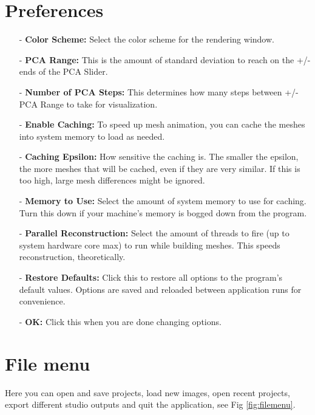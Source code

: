 \documentclass[letterpaper,12pt]{article}   %
\begin{document}
\section{Preferences}

\begin{itemize}
\item[-] \textbf{Color Scheme:} Select the color scheme for the rendering window.

\item[-] \textbf{PCA Range:} This is the amount of standard deviation to reach on the +/- ends of the PCA Slider.

\item[-] \textbf{Number of PCA Steps:} This determines how many steps between +/- PCA Range to take for visualization.

\item[-] \textbf{Enable Caching:} To speed up mesh animation, you can cache the meshes into system memory to load as needed.

\item[-] \textbf{Caching Epsilon:} How sensitive the caching is. The smaller the epsilon, the more meshes that will be cached, even if they are very similar. If this is too high, large mesh differences might be ignored.

\item[-] \textbf{Memory to Use:} Select the amount of system memory to use for caching. Turn this down if your machine's memory is bogged down from the program.

\item[-] \textbf{Parallel Reconstruction:} Select the amount of threads to fire (up to system hardware core max) to run while building meshes. This speeds reconstruction, theoretically.

\item[-] \textbf{Restore Defaults:} Click this to restore all options to the program's default values. Options are saved and reloaded between application runs for convenience.

\item[-] \textbf{OK:} Click this when you are done changing options.

\end{itemize}


\section{File menu}

Here you can open and save projects, load new images, open recent projects, export different studio outputs and quit the application, see Fig \ref{fig:filemenu}.
\end{document}
